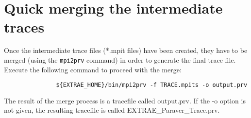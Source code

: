 

\section{Quick merging the intermediate traces}

Once the intermediate trace files (*.mpit files) have been created, they have to be merged (using the {\tt mpi2prv} command) in order to generate the final \PARAVER trace file. Execute the following command to proceed with the merge:

\begin{verbatim}
               ${EXTRAE_HOME}/bin/mpi2prv -f TRACE.mpits -o output.prv
\end{verbatim}

The result of the merge process is a \PARAVER tracefile called output.prv. If the -o option is not given, the resulting tracefile is called EXTRAE\_Paraver\_Trace.prv. 

